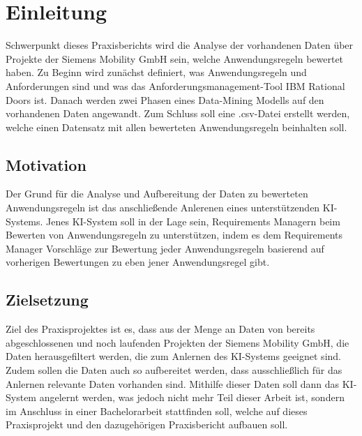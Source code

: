 \chapter{Einleitung}
\label{chap:einleitung}

Schwerpunkt dieses Praxisberichts wird die Analyse der vorhandenen Daten über Projekte der Siemens Mobility GmbH sein, welche Anwendungsregeln bewertet haben. Zu Beginn wird zunächst definiert, was
Anwendungsregeln und Anforderungen sind und was das Anforderungsmanagement-Tool IBM Rational Doors ist. Danach werden zwei Phasen eines Data-Mining Modells auf den vorhandenen Daten angewandt. Zum Schluss
soll eine .csv-Datei erstellt werden, welche einen Datensatz mit allen bewerteten Anwendungsregeln beinhalten soll. 

\section{Motivation}
\label{chap:Motivation}
Der Grund für die Analyse und Aufbereitung der Daten zu bewerteten Anwendungsregeln ist das anschließende Anlerenen eines unterstützenden KI-Systems. Jenes KI-System soll in der Lage sein,
Requirements Managern beim Bewerten von Anwendungsregeln zu unterstützen, indem es dem Requirements Manager Vorschläge zur Bewertung jeder Anwendungsregeln basierend auf vorherigen Bewertungen zu
eben jener Anwendungsregel gibt.

\section{Zielsetzung}
\label{chap:Zielsetzung}
Ziel des Praxisprojektes ist es, dass aus der Menge an Daten von bereits abgeschlossenen und noch laufenden Projekten der Siemens Mobility GmbH, die Daten herausgefiltert werden, die 
zum Anlernen des KI-Systems geeignet sind. Zudem sollen die Daten auch so aufbereitet werden, dass ausschließlich für das Anlernen relevante Daten vorhanden sind. Mithilfe dieser Daten
soll dann das KI-System angelernt werden, was jedoch nicht mehr Teil dieser Arbeit ist, sondern im Anschluss in einer Bachelorarbeit stattfinden soll, welche auf dieses Praxisprojekt und den 
dazugehörigen Praxisbericht aufbauen soll.

